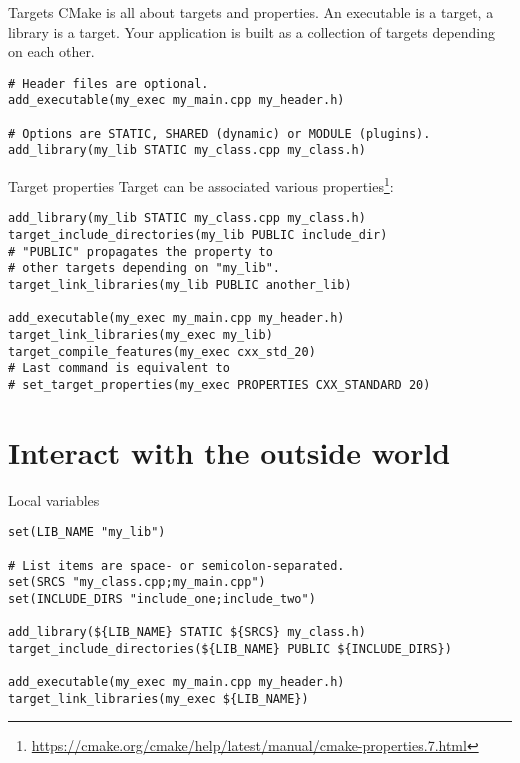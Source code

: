 \documentclass[aspectratio=169,11pt]{beamer}
\begin{document}
\begin{frame}[fragile]{Targets}
CMake is all about targets and properties. An executable is a target, a library is a target. Your application is built as a collection of targets depending on each other.

\begin{verbatim}
# Header files are optional.
add_executable(my_exec my_main.cpp my_header.h)

# Options are STATIC, SHARED (dynamic) or MODULE (plugins).
add_library(my_lib STATIC my_class.cpp my_class.h)
\end{verbatim}
\end{frame}

\begin{frame}[fragile]{Target properties}
Target can be associated various properties\footnote{\url{https://cmake.org/cmake/help/latest/manual/cmake-properties.7.html}}:
\begin{verbatim}
add_library(my_lib STATIC my_class.cpp my_class.h)
target_include_directories(my_lib PUBLIC include_dir)
# "PUBLIC" propagates the property to
# other targets depending on "my_lib".
target_link_libraries(my_lib PUBLIC another_lib)

add_executable(my_exec my_main.cpp my_header.h)
target_link_libraries(my_exec my_lib)
target_compile_features(my_exec cxx_std_20)
# Last command is equivalent to
# set_target_properties(my_exec PROPERTIES CXX_STANDARD 20)
\end{verbatim}
\end{frame}

\section{Interact with the outside world}
\begin{frame}[fragile]{Local variables}
\begin{verbatim}
set(LIB_NAME "my_lib")

# List items are space- or semicolon-separated.
set(SRCS "my_class.cpp;my_main.cpp")
set(INCLUDE_DIRS "include_one;include_two")

add_library(${LIB_NAME} STATIC ${SRCS} my_class.h)
target_include_directories(${LIB_NAME} PUBLIC ${INCLUDE_DIRS})

add_executable(my_exec my_main.cpp my_header.h)
target_link_libraries(my_exec ${LIB_NAME})
\end{verbatim}
\end{frame}
\end{document}
